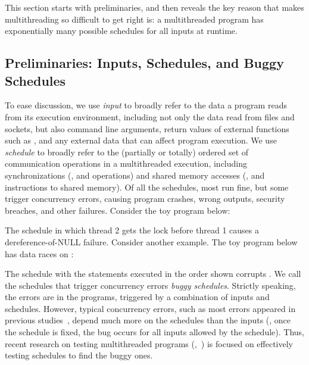 This section starts with preliminaries, and then reveals the key reason that
makes multithreading so difficult to get right is: a multithreaded program has
exponentially many possible schedules for all inputs at runtime.

\subsection{Preliminaries: Inputs, Schedules, and Buggy Schedules}

To ease discussion, we use \emph{input} to broadly refer to the data a
program reads from its execution environment, including not only the data
read from files and sockets, but also command line arguments, return
values of external functions such as , and any external data
that can affect program execution.  We use \emph{schedule} to broadly refer to
the (partially or totally) ordered set of communication operations in a
multithreaded execution, including synchronizations (\eg,  and
 operations) and shared memory accesses (\eg,  and
 instructions to shared memory). Of all the schedules, most run
fine, but some trigger concurrency errors, causing program crashes,
wrong outputs, security breaches, and other failures. Consider the toy program
below:

\hspace{2in}
\begin{minipage}{0.5\columnwidth}
\end{minipage}
\vspace{0.2in}

\noindent The schedule in which thread 2
gets the lock before thread 1 causes a dereference-of-NULL failure.  Consider
another example.  The toy program below has data races on :

\hspace{1.5in}
\begin{minipage}{0.5\columnwidth}
\end{minipage}

\noindent The schedule with the statements
executed in the order shown corrupts . We call the schedules that
trigger concurrency errors \emph{buggy schedules}.  Strictly speaking, the
errors are in the programs, triggered by a combination of inputs and schedules. 
However, typical concurrency errors, such as most errors appeared in previous
studies~\cite{lu:concurrency-bugs,con:hotpar12}, depend much more on the
schedules than the inputs (\eg, once the schedule is fixed, the bug
occurs for all inputs allowed by the schedule).  Thus, recent research on
testing multithreaded programs (\eg,~\cite{musuvathi:chess:osdi08}) is
focused on effectively testing schedules to find the buggy ones.

